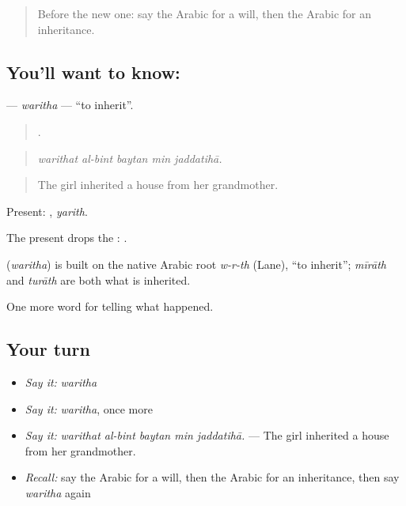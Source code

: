 \label{lesson:AR-C337-waritha}



\begin{quote}
Before the new one: say the Arabic for a will, then the Arabic for an inheritance.
\end{quote}

\subsection*{You'll want to know: }
\textbf{} — \emph{waritha} — \textquotedblleft{}to inherit\textquotedblright{}.

\begin{quote}
    .
\end{quote}

\begin{quote}
\emph{warithat al-bint baytan min jaddatihā.}
\end{quote}

\begin{quote}
The girl inherited a house from her grandmother.
\end{quote}

Present: , \emph{yarith}.

The present drops the : .

\begin{cousinweb}
\textbf{} (\emph{waritha}) is built on the native Arabic root \emph{w-r-th} (Lane), \textquotedblleft{}to inherit\textquotedblright{}; \emph{mīrāth} and \emph{turāth} are both what is inherited.
\end{cousinweb}

\begin{grammarlens}[title={What you've built}]
One more word for telling what happened.
\end{grammarlens}

\subsection*{Your turn}
\begin{itemize}
\raggedright
  \item \emph{Say it:} \emph{waritha}
  \item \emph{Say it:} \emph{waritha}, once more
  \item \emph{Say it:} \emph{warithat al-bint baytan min jaddatihā.} — The girl inherited a house from her grandmother.
  \item \emph{Recall:} say the Arabic for a will, then the Arabic for an inheritance, then say \emph{waritha} again
\end{itemize}

